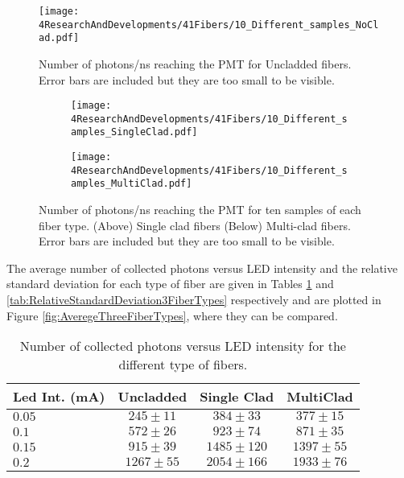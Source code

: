 \begin{figure}[h]
\centering
\texttt{[image: 4ResearchAndDevelopments/41Fibers/10\_Different\_samples\_NoClad.pdf]}
\caption{Number of photons/ns reaching the PMT for Uncladded fibers. Error bars are included but they are too small to be visible.\label{fig:10samplesNC}}
\end{figure}

\begin{figure}
\centering
    \begin{subfigure}[b]{1\textwidth}
    \centering
    \texttt{[image: 4ResearchAndDevelopments/41Fibers/10\_Different\_samples\_SingleClad.pdf]}  
    \caption{\label{subfig:10samplesSC}}
    \end{subfigure}
    \hfill
    \begin{subfigure}[b]{1\textwidth}
    \centering
    \texttt{[image: 4ResearchAndDevelopments/41Fibers/10\_Different\_samples\_MultiClad.pdf]}  
    \caption{\label{subfig:10samplesMC}}
    \end{subfigure}
 \caption{Number of photons/ns reaching the PMT for ten samples of each fiber type. (Above) Single clad fibers (Below) Multi-clad fibers. Error bars are included but they are too small to be visible.}
 \label{fig:10samplesThreeTypes}
\end{figure}
The average number of collected photons versus LED intensity and the relative standard deviation for each type of fiber are given in Tables \ref{tab:10DifferentSamples} and \ref{tab:RelativeStandardDeviation3FiberTypes} respectively and are plotted in Figure \ref{fig:AveregeThreeFiberTypes}, where they can be compared. 

\begin{table}[h]
\centering{}%
\begin{tabular}{lccc}
\toprule 
Led Int. (mA) & Uncladded & Single Clad & MultiClad \tabularnewline
\midrule
\midrule 
$0.05$ & $245 \pm 11$ & $384 \pm 33$ & $377 \pm 15$ \tabularnewline
$0.1$ & $572 \pm 26$ & $923 \pm 74$ & $871 \pm 35$ \tabularnewline
$0.15$ & $915 \pm 39$ & $1485 \pm 120$ & $1397 \pm 55$ \tabularnewline
$0.2$ & $1267 \pm 55$ & $2054 \pm 166$ & $1933 \pm 76$ \tabularnewline
\bottomrule
\end{tabular}
\caption{Number of collected photons versus LED intensity for the different type of fibers.}
\label{tab:10DifferentSamples}
\end{table}


